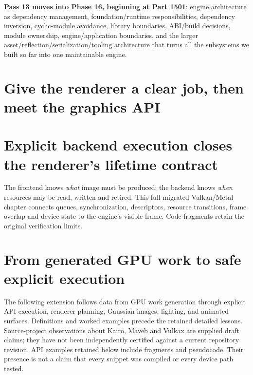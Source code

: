 \textbf{Pass 13 moves into Phase 16, beginning at Part 1501}: engine architecture as dependency management, foundation/runtime responsibilities, dependency inversion, cyclic-module avoidance, library boundaries, ABI/build decisions, module ownership, engine/application boundaries, and the larger asset/reflection/serialization/tooling architecture that turns all the subsystems we built so far into one maintainable engine.

\section{Give the renderer a clear job, then meet the graphics API}\label{05-engine-i-ch018-give-the-renderer-a-clear-job-then-meet-the-graphics-api}

\hypertarget{05-engine-i-ch018-give-the-renderer-a-clear-job-then-meet-the-graphics-api}{}

\section{Explicit backend execution closes the renderer's lifetime contract}\label{05-engine-i-ch018-explicit-backend-execution-closes-the-renderers-lifetime-contract}

\hypertarget{05-engine-i-ch018-explicit-backend-execution-closes-the-renderers-lifetime-contract}{}

The frontend knows \emph{what} image must be produced; the backend knows \emph{when} resources may be read, written and retired. This full migrated Vulkan/Metal chapter connects queues, synchronization, descriptors, resource transitions, frame overlap and device state to the engine's visible frame. Code fragments retain the original verification limits.

\section{From generated GPU work to safe explicit execution}\label{05-engine-i-ch018-from-generated-gpu-work-to-safe-explicit-execution}

\hypertarget{05-engine-i-ch018-from-generated-gpu-work-to-safe-explicit-execution}{}

The following extension follows data from GPU work generation through explicit API execution, renderer planning, Gaussian images, lighting, and animated surfaces. Definitions and worked examples precede the retained detailed lessons. Source-project observations about Kairo, Maveb and Vulkax are supplied draft claims; they have not been independently certified against a current repository revision. API examples retained below include fragments and pseudocode. Their presence is not a claim that every snippet was compiled or every device path tested.

